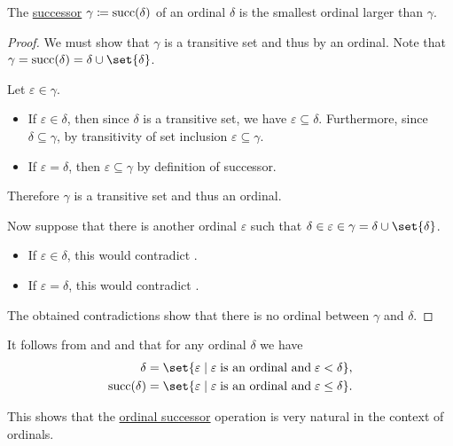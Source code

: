\begin{proposition}\label{thm:successor_of_ordinal}
  The \hyperref[def:ordinal_successor]{successor} \( \gamma \coloneqq \operatorname{succ}(\delta) \) of an ordinal \( \delta \) is the smallest ordinal larger than \( \gamma \).
\end{proposition}
\begin{proof}
  We must show that \( \gamma \) is a transitive set and thus by  an ordinal. Note that \( \gamma = \op{succ}(\delta) = \delta \cup \set{ \delta } \).

  Let \( \varepsilon \in \gamma \).
  \begin{itemize}
    \item If \( \varepsilon \in \delta \), then since \( \delta \) is a transitive set, we have \( \varepsilon \subseteq \delta \). Furthermore, since \( \delta \subseteq \gamma \), by transitivity of set inclusion \( \varepsilon \subseteq \gamma \).

    \item If \( \varepsilon = \delta \), then \( \varepsilon \subseteq \gamma \) by definition of successor.
  \end{itemize}

  Therefore \( \gamma \) is a transitive set and thus an ordinal.

  Now suppose that there is another ordinal \( \varepsilon \) such that \( \delta \in \varepsilon \in \gamma = \delta \cup \set{ \delta } \).
  \begin{itemize}
    \item If \( \varepsilon \in \delta \), this would contradict .

    \item If \( \varepsilon = \delta \), this would contradict .
  \end{itemize}

  The obtained contradictions show that there is no ordinal between \( \gamma \) and \( \delta \).
\end{proof}

\begin{remark}\label{rem:def:ordinal_successor}
  It follows from  and  and that for any ordinal \( \delta \) we have
  \begin{align*}
    \delta            &= \set{ \varepsilon \given \varepsilon \T{is an ordinal and} \varepsilon < \delta }, \\
    \op{succ}(\delta) &= \set{ \varepsilon \given \varepsilon \T{is an ordinal and} \varepsilon \leq \delta }.
  \end{align*}

  This shows that the \hyperref[def:ordinal_successor]{ordinal successor} operation is very natural in the context of ordinals.
\end{remark}

